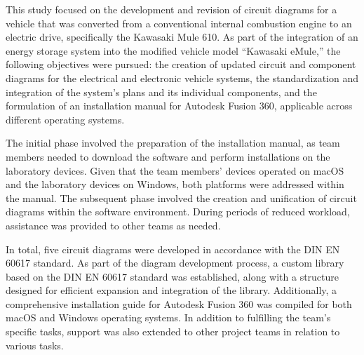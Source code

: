 This study focused on the development and revision of circuit diagrams for a vehicle that was converted from a conventional internal combustion engine to an electric drive, specifically the Kawasaki Mule 610. As part of the integration of an energy storage system into the modified vehicle model “Kawasaki eMule,” the following objectives were pursued: the creation of updated circuit and component diagrams for the electrical and electronic vehicle systems, the standardization and integration of the system’s plans and its individual components, and the formulation of an installation manual for Autodesk Fusion 360, applicable across different operating systems.

The initial phase involved the preparation of the installation manual, as team members needed to download the software and perform installations on the laboratory devices. Given that the team members’ devices operated on macOS and the laboratory devices on Windows, both platforms were addressed within the manual. The subsequent phase involved the creation and unification of circuit diagrams within the software environment. During periods of reduced workload, assistance was provided to other teams as needed.

In total, five circuit diagrams were developed in accordance with the DIN EN 60617 standard. As part of the diagram development process, a custom library based on the DIN EN 60617 standard was established, along with a structure designed for efficient expansion and integration of the library. Additionally, a comprehensive installation guide for Autodesk Fusion 360 was compiled for both macOS and Windows operating systems. In addition to fulfilling the team’s specific tasks, support was also extended to other project teams in relation to various tasks.

\clearpage